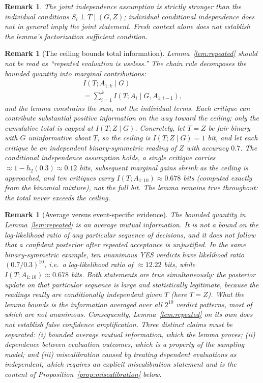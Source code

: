 \documentclass[a4paper,journal]{IAENGtran}
\newtheorem{Remark}[Theorem]{Remark}
\begin{document}
\begin{Remark}
The joint independence assumption is strictly stronger than the individual conditions
$S_i \perp T \mid (G,Z)$; individual conditional independence
does not in general imply the joint statement. Fresh context alone does not establish the
lemma's factorization sufficient condition.
\end{Remark}

\begin{Remark}[The ceiling bounds total information]
\label{rem:marginal}
Lemma~\ref{lem:repeated} should not be read as ``repeated evaluation is useless.'' The
chain rule decomposes the bounded quantity into marginal contributions:
\begin{multline*}
I(T; A_{1:k} \mid G) \\
= \sum_{i=1}^{k} I(T; A_i \mid G, A_{1:i-1}),
\end{multline*}
and the lemma constrains the sum, not the individual terms. Each critique can contribute
substantial positive information on the way toward the ceiling; only the cumulative total
is capped at $I(T; Z \mid G)$. Concretely, let $T = Z$ be fair binary with $G$
uninformative about $T$, so the ceiling is $I(T;Z\mid G) = 1$ bit, and let each critique
be an independent binary-symmetric reading of $Z$ with accuracy $0.7$. The conditional
independence assumption holds, a single critique carries $\approx 1 - h_2(0.3) \approx 0.12$
bits, subsequent marginal gains shrink as the ceiling is approached, and ten critiques
carry $I(T;A_{1:10}) \approx 0.678$ bits (computed exactly from the binomial mixture),
not the full bit. The lemma remains true throughout: the total
never exceeds the ceiling.
\end{Remark}

\begin{Remark}[Average versus event-specific evidence]
\label{rem:not_llr}
The bounded quantity in Lemma~\ref{lem:repeated} is an \emph{average} mutual
information. It is not a bound on the log-likelihood ratio of any particular sequence
of decisions, and it does not follow that a confident posterior after repeated
acceptance is unjustified. In the same binary-symmetric example, ten unanimous YES
verdicts have likelihood ratio $(0.7/0.3)^{10}$, i.e.\ a log-likelihood ratio of
$\approx 12.22$ bits, while $I(T;A_{1:10}) \approx 0.678$ bits. Both statements are
true simultaneously: the posterior update on that particular sequence is large and
statistically legitimate, because the readings really are conditionally independent
given $T$ (here $T=Z$). What the lemma bounds is the information averaged over all
$2^{10}$ verdict patterns, most of which are not unanimous. Consequently,
Lemma~\ref{lem:repeated} on its own does \emph{not} establish false confidence
amplification. Three distinct claims must be separated: (i) bounded average mutual
information, which the lemma proves; (ii) dependence between evaluation outcomes,
which is a property of the sampling model; and (iii) miscalibration caused by
treating dependent evaluations as independent, which requires an explicit
miscalibration statement and is the content of
Proposition~\ref{prop:miscalibration} below.
\end{Remark}
\end{document}
